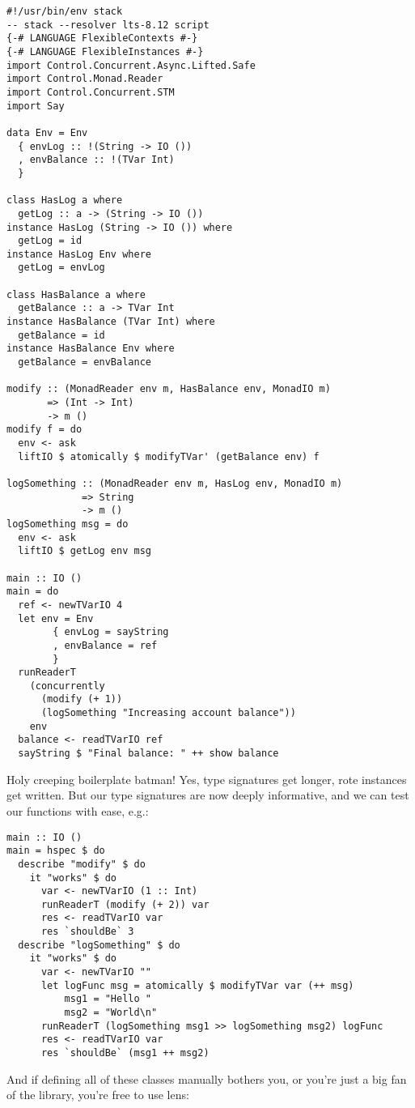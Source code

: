 \begin{verbatim}
#!/usr/bin/env stack
-- stack --resolver lts-8.12 script
{-# LANGUAGE FlexibleContexts #-}
{-# LANGUAGE FlexibleInstances #-}
import Control.Concurrent.Async.Lifted.Safe
import Control.Monad.Reader
import Control.Concurrent.STM
import Say

data Env = Env
  { envLog :: !(String -> IO ())
  , envBalance :: !(TVar Int)
  }

class HasLog a where
  getLog :: a -> (String -> IO ())
instance HasLog (String -> IO ()) where
  getLog = id
instance HasLog Env where
  getLog = envLog

class HasBalance a where
  getBalance :: a -> TVar Int
instance HasBalance (TVar Int) where
  getBalance = id
instance HasBalance Env where
  getBalance = envBalance

modify :: (MonadReader env m, HasBalance env, MonadIO m)
       => (Int -> Int)
       -> m ()
modify f = do
  env <- ask
  liftIO $ atomically $ modifyTVar' (getBalance env) f

logSomething :: (MonadReader env m, HasLog env, MonadIO m)
             => String
             -> m ()
logSomething msg = do
  env <- ask
  liftIO $ getLog env msg

main :: IO ()
main = do
  ref <- newTVarIO 4
  let env = Env
        { envLog = sayString
        , envBalance = ref
        }
  runReaderT
    (concurrently
      (modify (+ 1))
      (logSomething "Increasing account balance"))
    env
  balance <- readTVarIO ref
  sayString $ "Final balance: " ++ show balance
\end{verbatim}
Holy creeping boilerplate batman! Yes, type signatures get longer, rote
instances get written. But our type signatures are now deeply
informative, and we can test our functions with ease, e.g.:

\begin{verbatim}
main :: IO ()
main = hspec $ do
  describe "modify" $ do
    it "works" $ do
      var <- newTVarIO (1 :: Int)
      runReaderT (modify (+ 2)) var
      res <- readTVarIO var
      res `shouldBe` 3
  describe "logSomething" $ do
    it "works" $ do
      var <- newTVarIO ""
      let logFunc msg = atomically $ modifyTVar var (++ msg)
          msg1 = "Hello "
          msg2 = "World\n"
      runReaderT (logSomething msg1 >> logSomething msg2) logFunc
      res <- readTVarIO var
      res `shouldBe` (msg1 ++ msg2)
\end{verbatim}
And if defining all of these classes manually bothers you, or you're
just a big fan of the library, you're free to use lens:

